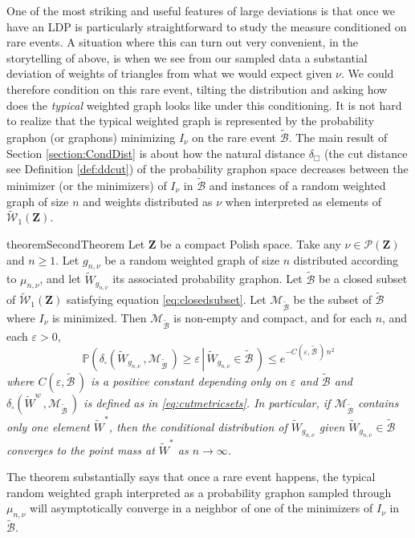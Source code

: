 \documentclass[12pt,twoside,a4paper]{article}
\newcommand{\Space}{\mathbf{Z}}
\newcommand{\UGraphon}{\widetilde{\mathcal{W}}_1}
\newcommand{\lep}{\left(}
\newcommand{\rip}{\right)}
\begin{document}
One of the most striking and useful features of large deviations is that once we have an LDP is particularly straightforward to study the measure conditioned on rare events. A situation where this can turn out very convenient, in the storytelling of above, is when we see from our sampled data a substantial deviation of weights of triangles from what we would expect given $\nu$. We could therefore condition on this rare event, tilting the distribution and asking how does the \emph{typical} weighted graph looks like under this conditioning. It is not hard to realize that the typical weighted graph is represented by the probability graphon (or graphons) minimizing $I_\nu$ on the rare event $\widetilde{\mathcal{B}}$. The main result of Section \ref{section:CondDist} is about how the natural distance $\delta_\Box$ (the cut distance see Definition \ref{def:ddcut}) of the probability graphon space decreases between the minimizer (or the minimizers) of $I_\nu$ in $\widetilde{\mathcal{B}}$ and instances of a random weighted graph of size $n$ and weights distributed as $\nu$ when interpreted as elements of $\UGraphon(\Space)$. 

\begin{restatable}{theorem}{SecondTheorem}\label{thm:CondDist}
 Let $\Space$ be a compact Polish space. Take any $\nu \in \mathcal{P}(\Space)$ and $n \geq 1$. Let $g_{n,\nu}$ be a random weighted graph of size $n$ distributed according to $\mu_{n,\nu}$, and let $\widetilde{W}_{g_{n,\nu}}$ its associated probability graphon. Let $\widetilde{\mathcal{B}}$ be a closed subset of $\UGraphon(\Space)$ satisfying equation \eqref{eq:closedsubset}. Let $\mathscr{M}_{\widetilde{\mathcal{B}}}$ be the subset of $\widetilde{\mathcal{B}}$ where $I_\nu$ is minimized. Then $\mathscr{M}_{\widetilde{\mathcal{B}}}$ is non-empty and compact, and for each $n$, and each $\varepsilon > 0$,
\[
\mathbb{P}\lep\left.\delta_{\square}(\widetilde{W}_{g_{n,\nu}}\,, \mathscr{M}_{\widetilde{\mathcal{B}}}\,) \geq \varepsilon \,\right|\, \widetilde{W}_{g_{n,\nu}} \in \widetilde{\mathcal{B}}\,\rip \leq e^{-C(\varepsilon, \widetilde{\mathcal{B}}\,)\, n^2}
\]
\textit{where $C(\varepsilon, \widetilde{\mathcal{B}}\,)$ is a positive constant depending only on $\varepsilon$ and $\widetilde{\mathcal{B}}$ and $\delta_{\square}(\widetilde{W}^w\,, \mathscr{M}_{\widetilde{\mathcal{B}}}\,)$ is defined as in \eqref{eq:cutmetricsets}. In particular, if $\mathscr{M}_{\widetilde{\mathcal{B}}}$ contains only one element $\widetilde{W}^*$, then the conditional distribution of $\widetilde{W}_{g_{n,\nu}}$ given $\widetilde{W}_{g_{n,\nu}}\in \widetilde{\mathcal{B}}$ converges to the point mass at $\widetilde{W}^*$ as $n \to \infty$.}
\end{restatable}
The theorem substantially says that once a rare event happens, the typical random weighted graph interpreted as a probability graphon sampled through  $\mu_{n,\nu}$ will asymptotically converge in a neighbor of one of the minimizers of $I_\nu$ in $\widetilde{\mathcal{B}}$.
\end{document}
